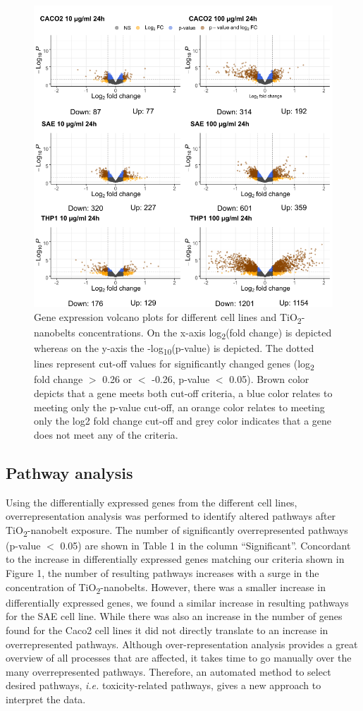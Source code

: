 \documentclass[ijms,article,submit,moreauthors,pdftex]{Definitions/mdpi}
\begin{document}
\begin{figure}[ht!]
\includegraphics[width=0.9\linewidth]{fig1.png}
  \caption{Gene expression volcano plots for different cell lines and TiO\textsubscript{2}-nanobelts concentrations.
   On the x-axis log\textsubscript{2}(fold change) is depicted whereas on the y-axis the -log\textsubscript{10}(p-value) is depicted. The dotted lines represent cut-off values for significantly changed genes (log\textsubscript{2} fold change $>$ 0.26 or $<$ -0.26, p-value $<$ 0.05). Brown color depicts that a gene meets both cut-off criteria, a blue color relates to meeting only the p-value cut-off, an orange color relates to meeting only the log2 fold change cut-off and grey color indicates that a gene does not meet any of the criteria.}
\label{fig:fig1}
\end{figure}

\subsection*{Pathway analysis}
Using the differentially expressed genes from the different cell lines, overrepresentation analysis was performed to identify altered pathways after TiO\textsubscript{2}-nanobelt exposure. The number of significantly overrepresented pathways (p-value $<$ 0.05) are shown in Table 1 in the column “Significant”. Concordant to the increase in differentially expressed genes matching our criteria shown in Figure 1, the number of resulting pathways increases with a surge in the concentration of TiO\textsubscript{2}-nanobelts. However, there was a smaller increase in differentially expressed genes, we found a similar increase in resulting pathways for the SAE cell line. While there was also an increase in the number of genes found for the Caco2 cell lines it did not directly translate to an increase in overrepresented pathways. Although over-representation analysis provides a great overview of all processes that are affected, it takes time to go manually over the many overrepresented pathways. Therefore, an automated method to select desired pathways, \textit{i.e.} toxicity-related pathways, gives a new approach to interpret the data. 
\end{document}
